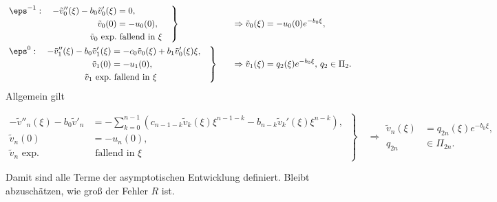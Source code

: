 \begin{align*}
  &\left.
    \begin{aligned}
      \eps^{-1}:\quad-\tilde v''_0(\xi)-b_0\tilde v'_0(\xi) &= 0,\\
      \tilde v_0(0)&=-u_0(0),\\
      \tilde v_0 \mbox{ exp.}&\mbox{ fallend in $\xi$}
    \end{aligned}\quad
  \right\}&\quad\Rightarrow \tilde v_0(\xi)&=-u_0(0)e^{-b_0\xi},\\
  &\left.
    \begin{aligned}
      \eps^{0}:\quad-\tilde v''_1(\xi)-b_0\tilde v'_1(\xi) &= -c_0\tilde v_0(\xi)+b_1\tilde v_0'(\xi)\xi,\\
      \tilde v_1(0)&=-u_1(0),\\
      \tilde v_1 \mbox{ exp.}&\mbox{ fallend in $\xi$}
    \end{aligned}\quad
  \right\}&\quad\Rightarrow \tilde v_1(\xi)&=q_2(\xi)e^{-b_0\xi},\,q_2\in\Pi_2.
\end{align*}
Allgemein gilt

\begin{equation}\label{eq:vn}
  \left.
    \begin{aligned}
      -\tilde v''_{n}(\xi)-b_0\tilde v'_{n}
      &=-\sum\limits_{k=0}^{n-1}\left( c_{n-1-k}\tilde v_k(\xi)\xi^{n-1-k}-b_{n-k}\tilde v_k'(\xi)\xi^{n-k}\right) ,\\
      \tilde v_{n}(0)&=-u_{n}(0),\\
      \tilde v_{n} \mbox{ exp.}&\mbox{ fallend in $\xi$}
    \end{aligned}\,
  \right\}
  \quad\Rightarrow
  \begin{aligned}
    \tilde v_{n}(\xi) &= q_{2n}(\xi)e^{-b_0\xi},\\
    q_{2n}&\in\Pi_{2n}.
  \end{aligned}
\end{equation}

Damit sind alle Terme der asymptotischen Entwicklung definiert. Bleibt abzuschätzen, wie groß der Fehler $R$ ist.
